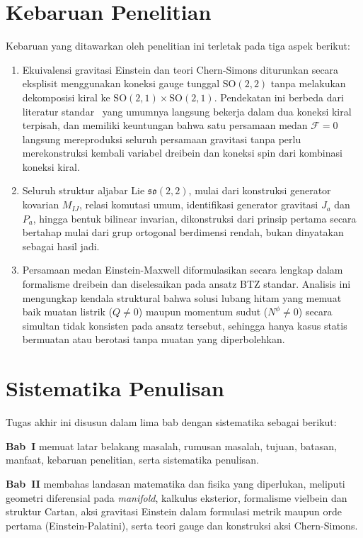 \section{Kebaruan Penelitian}
\noindent Kebaruan yang ditawarkan oleh penelitian ini terletak pada tiga aspek berikut:
\begin{enumerate}[label=\arabic*.]
    \item Ekuivalensi gravitasi Einstein dan teori Chern-Simons diturunkan secara eksplisit menggunakan koneksi gauge tunggal $\mathrm{SO}(2,2)$ tanpa melakukan dekomposisi kiral ke $\mathrm{SO}(2,1) \times \mathrm{SO}(2,1)$. Pendekatan ini berbeda dari literatur standar~\cite{witten1988, achucarro1986} yang umumnya langsung bekerja dalam dua koneksi kiral terpisah, dan memiliki keuntungan bahwa satu persamaan medan $\mathcal{F} = 0$ langsung mereproduksi seluruh persamaan gravitasi tanpa perlu merekonstruksi kembali variabel dreibein dan koneksi spin dari kombinasi koneksi kiral.
    \item Seluruh struktur aljabar Lie $\mathfrak{so}(2,2)$, mulai dari konstruksi generator kovarian $M_{IJ}$, relasi komutasi umum, identifikasi generator gravitasi $J_a$ dan $P_a$, hingga bentuk bilinear invarian, dikonstruksi dari prinsip pertama secara bertahap mulai dari grup ortogonal berdimensi rendah, bukan dinyatakan sebagai hasil jadi.
    \item Persamaan medan Einstein-Maxwell diformulasikan secara lengkap dalam formalisme dreibein dan diselesaikan pada ansatz BTZ standar. Analisis ini mengungkap kendala struktural bahwa solusi lubang hitam yang memuat baik muatan listrik ($Q \neq 0$) maupun momentum sudut ($N^\phi \neq 0$) secara simultan tidak konsisten pada ansatz tersebut, sehingga hanya kasus statis bermuatan atau berotasi tanpa muatan yang diperbolehkan.
\end{enumerate}

\section{Sistematika Penulisan}
Tugas akhir ini disusun dalam lima bab dengan sistematika sebagai berikut:

\vspace{0.5em}
\noindent\textbf{Bab~I} memuat latar belakang masalah, rumusan masalah, tujuan, batasan, manfaat, kebaruan penelitian, serta sistematika penulisan.

\vspace{0.3em}
\noindent\textbf{Bab~II} membahas landasan matematika dan fisika yang diperlukan, meliputi geometri diferensial pada \textit{manifold}, kalkulus eksterior, formalisme vielbein dan struktur Cartan, aksi gravitasi Einstein dalam formulasi metrik maupun orde pertama (Einstein-Palatini), serta teori gauge dan konstruksi aksi Chern-Simons.

